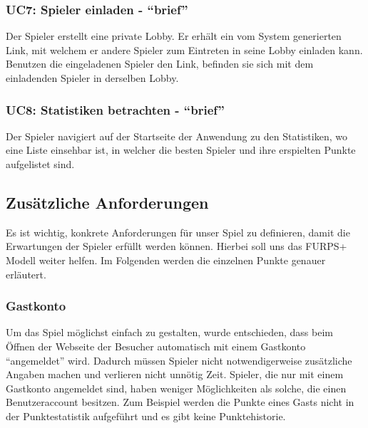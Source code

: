 \documentclass[11pt,ngerman]{article}
\newcommand{\quotes}[1]{``#1''}
\begin{document}
    \subsubsection{UC7: Spieler einladen - \quotes{brief}}
    \label{sssec:UC7Spielereinladen}
    \begin{tcolorbox}[enhanced, breakable, sharp corners, width=\dimexpr\textwidth-15mm\relax ,enlarge left by=10mm ,fontupper=\linespread{1.1}\selectfont, boxrule=1pt, title={UC7: Spieler einladen}, colback=white, colframe=gray!22, coltitle=black]
    	Der Spieler erstellt eine private \Gls{Lobby}. Er erhält ein vom System generierten Link, mit welchem er andere Spieler zum Eintreten in seine \Gls{Lobby} einladen kann.\newline
    	Benutzen die eingeladenen Spieler den Link, befinden sie sich mit dem einladenden Spieler in derselben Lobby.
    \end{tcolorbox}

    \subsubsection{UC8: Statistiken betrachten - \quotes{brief}}
    \label{sssec:UC8Statistikenbetrachten}
    \begin{tcolorbox}[enhanced, breakable, sharp corners, width=\dimexpr\textwidth-15mm\relax ,enlarge left by=10mm ,fontupper=\linespread{1.1}\selectfont, boxrule=1pt, title={UC8: Statistiken betrachten}, colback=white, colframe=gray!22, coltitle=black]
    	Der Spieler navigiert auf der Startseite der Anwendung zu den Statistiken, wo eine Liste einsehbar ist, in welcher die besten Spieler und ihre erspielten Punkte aufgelistet sind.
    \end{tcolorbox}

    \subsection{Zusätzliche Anforderungen}
    Es ist wichtig, konkrete Anforderungen für unser Spiel zu definieren, damit die Erwartungen der Spieler erfüllt werden können. Hierbei soll uns das FURPS+ Modell weiter helfen. Im Folgenden werden die einzelnen Punkte genauer erläutert.
    \subsubsection{Gastkonto}
    Um das Spiel möglichst einfach zu gestalten, wurde entschieden, dass beim Öffnen der Webseite der Besucher automatisch mit einem Gastkonto \quotes{angemeldet} wird. Dadurch müssen Spieler nicht notwendigerweise zusätzliche Angaben machen und verlieren nicht unnötig Zeit. Spieler, die nur mit einem Gastkonto angemeldet sind, haben weniger Möglichkeiten als solche, die einen Benutzeraccount besitzen. Zum Beispiel werden die Punkte eines Gasts nicht in der Punktestatistik aufgeführt und es gibt keine Punktehistorie.
\end{document}
